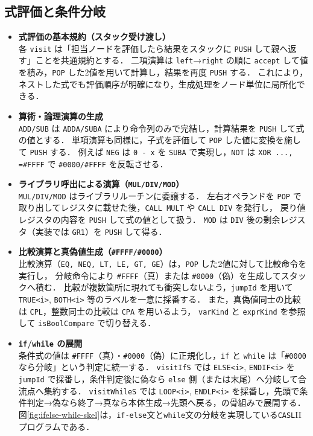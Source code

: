 \documentclass[a4j,10pt]{jarticle}
\begin{document}
\subsection{式評価と条件分岐}
\begin{itemize}
  \item \textbf{式評価の基本規約（スタック受け渡し）}\\
  各 \verb|visit| は「担当ノードを評価したら結果をスタックに \verb|PUSH| して親へ返す」ことを共通規約とする．
  二項演算は \verb|left|→\verb|right| の順に \verb|accept| して値を積み，\verb|POP| した2値を用いて計算し，結果を再度 \verb|PUSH| する．
  これにより，ネストした式でも評価順序が明確になり，生成処理をノード単位に局所化できる．

  \item \textbf{算術・論理演算の生成}\\
  \verb|ADD/SUB| は \verb|ADDA/SUBA| により命令列のみで完結し，計算結果を \verb|PUSH| して式の値とする．
  単項演算も同様に，子式を評価して \verb|POP| した値に変換を施して \verb|PUSH| する．
  例えば \verb|NEG| は \texttt{0 - x} を \verb|SUBA| で実現し，\verb|NOT| は \verb|XOR ..., =#FFFF| で \verb|#0000/#FFFF| を反転させる．

  \item \textbf{ライブラリ呼出による演算（\texttt{MUL/DIV/MOD}）}\\
  \verb|MUL/DIV/MOD| はライブラリルーチンに委譲する．
  左右オペランドを \verb|POP| で取り出してレジスタに載せた後，\verb|CALL MULT| や \verb|CALL DIV| を発行し，
  戻り値レジスタの内容を \verb|PUSH| して式の値として扱う．
  \verb|MOD| は \verb|DIV| 後の剰余レジスタ（実装では \verb|GR1|）を \verb|PUSH| して得る．

  \item \textbf{比較演算と真偽値生成（\texttt{\#FFFF/\#0000}）}\\
  比較演算（\verb|EQ, NEQ, LT, LE, GT, GE|）は，\verb|POP| した2値に対して比較命令を実行し，
  分岐命令により \verb|#FFFF|（真）または \verb|#0000|（偽）を生成してスタックへ積む．
  比較が複数箇所に現れても衝突しないよう，\verb|jumpId| を用いて \texttt{TRUE<i>}, \texttt{BOTH<i>} 等のラベルを一意に採番する．
  また，真偽値同士の比較は \verb|CPL|，整数同士の比較は \verb|CPA| を用いるよう，
  \verb|varKind| と \verb|exprKind| を参照して \verb|isBoolCompare| で切り替える．

  \item \textbf{\texttt{if}/\texttt{while} の展開}\\
  条件式の値は \verb|#FFFF|（真）・\verb|#0000|（偽）に正規化し，\verb|if| と \verb|while| は「\verb|#0000| なら分岐」という判定に統一する．
  \verb|visitIfS| では \texttt{ELSE<i>}, \texttt{ENDIF<i>} を \verb|jumpId| で採番し，条件判定後に偽なら \texttt{else} 側（または末尾）へ分岐して合流点へ集約する．
  \verb|visitWhileS| では \texttt{LOOP<i>}, \texttt{ENDLP<i>} を採番し，先頭で条件判定→偽なら終了→真なら本体生成→先頭へ戻る，の骨組みで展開する．
  図\ref{fig:ifelse-while-skel}は，\verb|if-else|文と\verb|while|文の分岐を実現している\verb|CASL|IIプログラムである．
\end{itemize}
\end{document}
